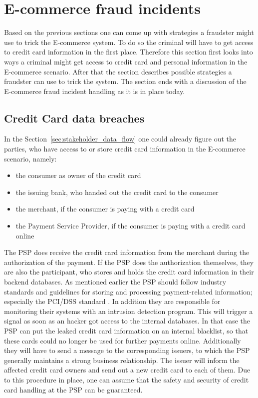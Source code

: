 
\section{\gls{E-commerce} fraud incidents}
\label{sec:scenario_fraud}

Based on the previous sections one can come up with strategies a fraudster might use to trick the \gls{E-commerce} system. To do so the criminal will have to get access to credit card information in the first place. Therefore this section first looks into ways a criminal might get access to credit card and personal information in the \gls{E-commerce} scenario. After that the section describes possible strategies a fraudster can use to trick the system. The section ends with a discussion of the \gls{E-commerce} fraud incident handling as it is in place today.

\subsection{Credit Card data breaches}
\label{subsec:leaking_credit_cards}

 In the Section~\ref{sec:stakeholder_data_flow} one could already figure out the parties, who have access to or store credit card information in the \gls{E-commerce} scenario, namely:\@

\begin{itemize}
  \item the consumer as owner of the credit card
  \item the issuing bank, who handed out the credit card to the consumer
  \item the merchant, if the consumer is paying with a credit card
  \item the Payment Service Provider, if the consumer is paying with a credit card online
\end{itemize}

The \gls{PSP} does receive the credit card information from the merchant during the authorization of the payment. If the \gls{PSP} does the authorization themselves, they are also the participant, who stores and holds the credit card information in their backend databases. As mentioned earlier the \gls{PSP} should follow industry standards and guidelines for storing and processing payment-related information; especially the \gls{PCI/DSS} standard \citep{virtue2009payment}. In addition they are responsible for monitoring their systems with an intrusion detection program. This will trigger a signal as soon as an hacker got access to the internal databases. In that case the \gls{PSP} can put the leaked credit card information on an internal blacklist, so that these cards could no longer be used for further payments online. Additionally they will have to send a message to the corresponding issuers, to which the \gls{PSP} generally maintains a strong business relationship. The issuer will inform the affected credit card owners and send out a new credit card to each of them. Due to this procedure in place, one can assume that the safety and security of credit card handling at the \gls{PSP} can be guaranteed. \\

